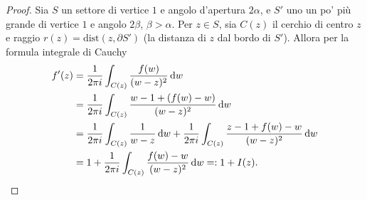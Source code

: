 \begin{proof}

  Sia $S$ un settore di vertice $1$ e angolo d'apertura $2\alpha$, e $S'$ uno un po' più grande di vertice $1$ e angolo $2\beta$, $\beta>\alpha$. Per $z \in S$, sia $C(z)$ il cerchio di centro $z$ e raggio $r(z)=\text{dist}(z, \partial S')$ (la distanza di $z$ dal bordo di $S'$). Allora per la formula integrale di Cauchy
  \begin{align*}
    f'(z) & =\frac{1}{2\pi i} \int_{C(z)} \frac{f(w)}{(w-z)^2}\mathop{}\!\mathrm{d} w \\
    & =\frac{1}{2\pi i} \int_{C(z)} \frac{w-1+(f(w)-w)}{(w-z)^2}\mathop{}\!\mathrm{d} w \\
    & =\frac{1}{2\pi i} \int_{C(z)} \frac{1}{w-z}\mathop{}\!\mathrm{d} w+\frac{1}{2\pi i} \int_{C(z)} \frac{z-1+f(w)-w}{(w-z)^2}\mathop{}\!\mathrm{d} w \\
    & =1+\frac{1}{2\pi i} \int_{C(z)} \frac{f(w)-w}{(w-z)^2}\mathop{}\!\mathrm{d} w=:1+I(z).
  \end{align*}


\end{proof}

